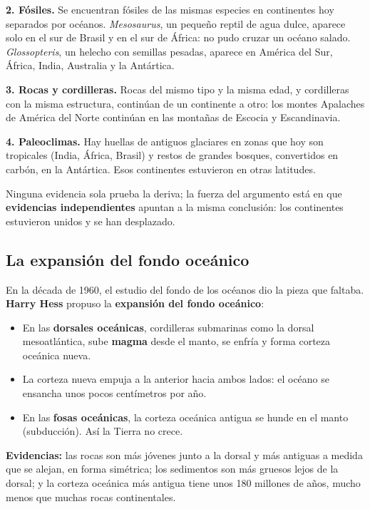  

\textbf{2. Fósiles.} Se encuentran fósiles de las mismas especies en continentes hoy separados por océanos. \emph{Mesosaurus}, un pequeño reptil de agua dulce, aparece solo en el sur de Brasil y en el sur de África: no pudo cruzar un océano salado. \emph{Glossopteris}, un helecho con semillas pesadas, aparece en América del Sur, África, India, Australia y la Antártica.

  

\textbf{3. Rocas y cordilleras.} Rocas del mismo tipo y la misma edad, y cordilleras con la misma estructura, continúan de un continente a otro: los montes Apalaches de América del Norte continúan en las montañas de Escocia y Escandinavia.

 

\textbf{4. Paleoclimas.} Hay huellas de antiguos glaciares en zonas que hoy son tropicales (India, África, Brasil) y restos de grandes bosques, convertidos en carbón, en la Antártica. Esos continentes estuvieron en otras latitudes.

 
\begin{clave}[{Recuerda}] Ninguna evidencia sola prueba la deriva; la fuerza del argumento está en que \textbf{evidencias independientes} apuntan a la misma conclusión: los continentes estuvieron unidos y se han desplazado.\end{clave}
\subsection{La expansión del fondo oceánico}
En la década de 1960, el estudio del fondo de los océanos dio la pieza que faltaba. \textbf{Harry Hess} propuso la \textbf{expansión del fondo oceánico}:

 
\begin{itemize}
  \item En las \textbf{dorsales oceánicas}, cordilleras submarinas como la dorsal mesoatlántica, sube \textbf{magma} desde el manto, se enfría y forma corteza oceánica nueva.
  \item La corteza nueva empuja a la anterior hacia ambos lados: el océano se ensancha unos pocos centímetros por año.
  \item En las \textbf{fosas oceánicas}, la corteza oceánica antigua se hunde en el manto (subducción). Así la Tierra no crece.
\end{itemize}
 

\textbf{Evidencias:} las rocas son más jóvenes junto a la dorsal y más antiguas a medida que se alejan, en forma simétrica; los sedimentos son más gruesos lejos de la dorsal; y la corteza oceánica más antigua tiene unos 180 millones de años, mucho menos que muchas rocas continentales.

